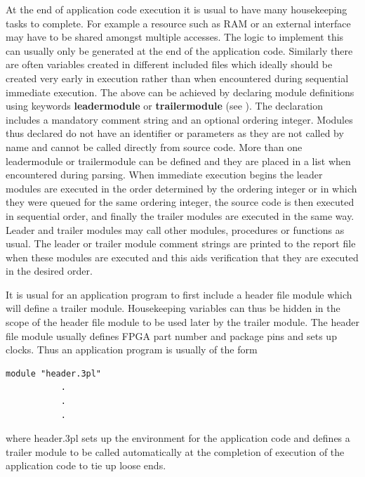         At the end of application code execution it is usual to have many
        housekeeping tasks to complete. For example a resource such as RAM or
        an external interface may have to be shared amongst multiple accesses.
        The logic to implement this can usually only be generated at the end
        of the application code. Similarly there are often variables created
        in different included files which ideally should be created very early
        in execution rather than when encountered during sequential immediate
        execution. The above can be achieved by declaring module definitions
        using keywords {\bf leadermodule} or {\bf trailermodule} (see
        ). The declaration includes a mandatory comment
        string and an optional ordering integer. Modules thus declared do not
        have an identifier or parameters as they are not called by name and
        cannot be called directly from source code. More than one leadermodule
        or trailermodule can be defined and they are placed in a list when
        encountered during parsing. When immediate execution begins the leader
        modules are executed in the order determined by the ordering integer
        or in which they were queued for the same ordering integer, the source
        code is then executed in sequential order, and finally the trailer
        modules are executed in the same way. Leader and trailer modules may
        call other modules, procedures or functions as usual. The leader or
        trailer module comment strings are printed to the report file when
        these modules are executed and this aids verification that they are
        executed in the desired order.

        It is usual for an application program to first include a header file
        module which will define a trailer module. Housekeeping variables can
        thus be hidden in the scope of the header file module to be used later
        by the trailer module. The header file module usually defines FPGA
        part number and package pins and sets up clocks. Thus an application
        program is usually of the form
        \begin{lstlisting}[gobble=8, language=threepl]
           module "header.3pl"
           .
           .
           .
        \end{lstlisting}
        where header.3pl sets up the environment for the application code
        and defines a trailer module to be called automatically at the
        completion of execution of the application code to tie up loose ends.

